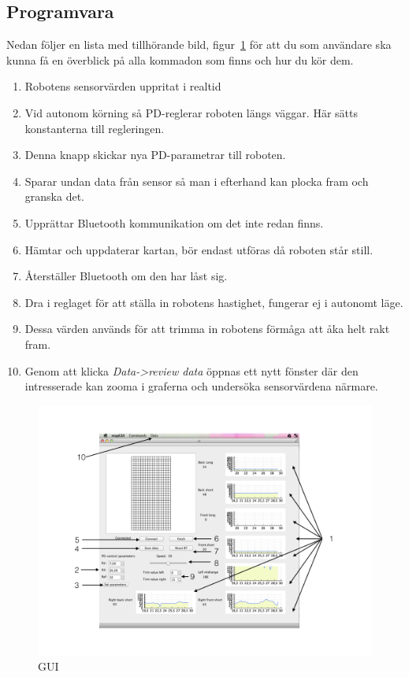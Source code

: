 \documentclass[a4paper,12pt,fleqn]{article}
\begin{document}
\subsection*{Programvara}
Nedan följer en lista med tillhörande bild, figur~\ref{fig:gui_man} för att du som användare ska kunna få en överblick på alla kommadon som finns och hur du kör dem. 

\begin{enumerate}
	\item Robotens sensorvärden uppritat i realtid  
	\item Vid autonom körning så PD-reglerar roboten längs väggar. Här sätts konstanterna till regleringen.
	\item Denna knapp skickar nya PD-parametrar till roboten.
	\item Sparar undan data från sensor så man i efterhand kan plocka fram och granska det. 
	\item Upprättar Bluetooth kommunikation om det inte redan finns.
	\item Hämtar och uppdaterar kartan, bör endast utföras då roboten står still.
	\item Återställer Bluetooth om den har låst sig.
	\item Dra i reglaget för att ställa in robotens hastighet, fungerar ej i autonomt läge.
	\item Dessa värden används för att trimma in robotens förmåga att åka helt rakt fram. 
	\item Genom att klicka \emph{Data->review data} öppnas ett nytt fönster där den intresserade kan zooma i graferna och undersöka sensorvärdena närmare.  
\end{enumerate}	


\begin{figure}[htp] %
  \begin{center}
  \includegraphics[keepaspectratio=true,width=1\textwidth]{bilder/Gui_manual.png}  %
  \end{center}
  \caption{GUI} %
  \label{fig:gui_man} %
\end{figure}
\end{document}
